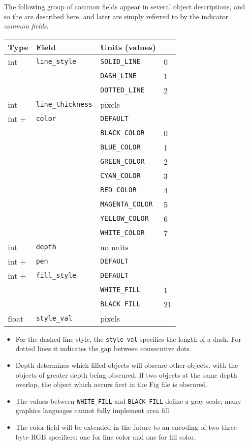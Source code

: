 The following group of common fields appear in several object
	descriptions, and so the are described here, and later are
	simply referred to by the indicator {\it common fields}.
%
\vspace{2pt}
\begin{center}
\begin{tabular} {|l|l|ll|}
\hline
Type	& Field			& Units (values)	&	\\ \hline
\hline
int	& {\tt line\_style}	& {\tt SOLID\_LINE}	& 0	\\
	&			& {\tt DASH\_LINE}	& 1	\\
	&			& {\tt DOTTED\_LINE}	& 2	\\ \hline
%
int	& {\tt line\_thickness}	& pixels		&	\\ \hline
%
int +	& {\tt color}		& {\tt DEFAULT}		& 	\\
 	&		        & {\tt BLACK\_COLOR}	& 0	\\
 	&              		& {\tt BLUE\_COLOR}	& 1	\\
 	&              		& {\tt GREEN\_COLOR}	& 2	\\ 
 	&              		& {\tt CYAN\_COLOR}	& 3	\\ 
 	&              		& {\tt RED\_COLOR}	& 4	\\ 
 	&              		& {\tt MAGENTA\_COLOR}	& 5	\\ 
 	&              		& {\tt YELLOW\_COLOR}	& 6	\\ 
 	&              		& {\tt WHITE\_COLOR}	& 7	\\ \hline
%
int  	& {\tt depth}		& no units		&	\\ \hline
%
int +	& {\tt pen}		& {\tt DEFAULT}		&	\\ \hline
%
int +	& {\tt fill\_style}	& {\tt DEFAULT}		& 	\\
	&			& {\tt WHITE\_FILL}	&   1	\\
	&			& {\tt BLACK\_FILL}	&   21	\\ \hline
%
float	& {\tt style\_val}	& pixels		&	\\ \hline
\end{tabular}
\end{center}
\vspace{4pt}

\begin{itemize}
\item For the dashed line style, the {\tt style\_val}	specifies the length of a dash.
For dotted lines it indicates the gap between consecutive dots. 

\item Depth determines which filled objects will obscure other objects,
	with the objects of greater depth being obscured.
If two objects at the same depth overlap, the object which occurs first
	in the Fig file is obscured.

\item The values between {\tt WHITE\_FILL} and {\tt BLACK\_FILL} define
	a gray scale; many graphics languages cannot fully implement area fill.

\item The color field will be extended in the future to an encoding of two
	three-byte RGB specifiers: one for line color and one for fill color.
\end{itemize}

